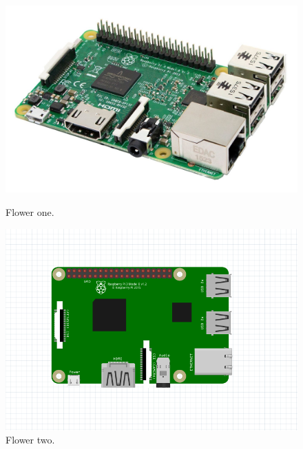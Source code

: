 \begin{figure}[h]
	\centering
	\begin{minipage}[b]{0.4\textwidth}
		\includegraphics[width=\textwidth]{img/hardware/rasp3-img.jpg}
		\caption{Flower one.}
	\end{minipage}
	\hfill
	\begin{minipage}[b]{0.4\textwidth}
		\includegraphics[width=\textwidth]{img/hardware/rasp-esquema.PNG}
		\caption{Flower two.}
	\end{minipage}
\end{figure}




